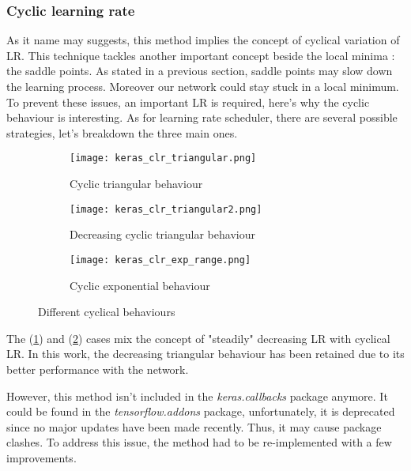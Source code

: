 \documentclass [12pt] {article}
\numberwithin{equation}{section} %
\numberwithin{figure}{section}   %
\begin{document}
\subsubsection{Cyclic learning rate}

As it name may suggests, this method implies the concept of cyclical variation of LR. This technique tackles another important concept beside the local minima : the saddle points. As stated in a previous section, saddle points may slow down the learning process. Moreover our network could stay stuck in a local minimum. To prevent these issues, an important LR is required, here's why the cyclic behaviour is interesting.
As for learning rate scheduler, there are several possible strategies, let's breakdown the three main ones.

\begin{figure}[H]
    \centering
    \begin{subfigure}{0.47\textwidth}
        \centering
        \texttt{[image: keras\_clr\_triangular.png]}
        \caption{Cyclic triangular behaviour}
    \end{subfigure}
    \hspace{1.3cm}
    \begin{subfigure}{0.47\textwidth}
        \centering
        \texttt{[image: keras\_clr\_triangular2.png]}
        \caption{Decreasing cyclic triangular behaviour}
        \label{t2}
    \end{subfigure}
    \hfill
    \begin{subfigure}{0.47\textwidth}
        \centering
        \texttt{[image: keras\_clr\_exp\_range.png]}
        \caption{Cyclic exponential behaviour}
        \label{exp}
    \end{subfigure}
    \caption{Different cyclical behaviours}
    \label{CLR types}
\end{figure}

The (\ref{t2}) and (\ref{exp}) cases mix the concept of "steadily" decreasing LR with cyclical LR. In this work, the decreasing triangular behaviour has been retained due to its better performance with the network.

However, this method isn't included in the \textit{keras.callbacks} package anymore. It could be found in the \textit{tensorflow.addons} package, unfortunately, it is deprecated since no major updates have been made recently. Thus, it may cause package clashes. To address this issue, the method had to be re-implemented with a few improvements.
\end{document}
